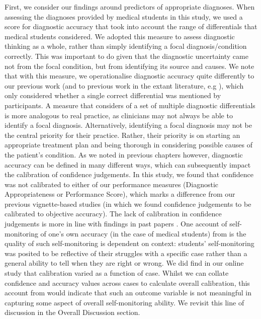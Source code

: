 \documentclass[a4paper, nobind]{templates/ociamthesis}
\begin{document}
First, we consider our findings around predictors of appropriate diagnoses. When assessing the diagnoses provided by medical students in this study, we used a score for diagnostic accuracy that took into account the range of differentials that medical students considered. We adopted this measure to assess diagnostic thinking as a whole, rather than simply identifying a focal diagnosis/condition correctly. This was important to do given that the diagnostic uncertainty came not from the focal condition, but from identifying its source and causes. We note that with this measure, we operationalise diagnostic accuracy quite differently to our previous work (and to previous work in the extant literature, e.g \autocite{meyer_physicians_2013,kammer_differential_2021}), which only considered whether a single correct differential was mentioned by participants. A measure that considers of a set of multiple diagnostic differentials is more analogous to real practice, as clinicians may not always be able to identify a focal diagnosis. Alternatively, identifying a focal diagnosis may not be the central priority for their practice. Rather, their priority is on starting an appropriate treatment plan and being thorough in considering possible causes of the patient's condition. As we noted in previous chapters however, diagnostic accuracy can be defined in many different ways, which can subsequently impact the calibration of confidence judgements. In this study, we found that confidence was not calibrated to either of our performance measures (Diagnostic Appropriateness or Performance Score), which marks a difference from our previous vignette-based studies (in which we found confidence judgements to be calibrated to objective accuracy). The lack of calibration in confidence judgements is more in line with findings in past papers \autocite{friedman_are_2001,meyer_physicians_2013,jaspan_improving_2022}. One account of self-monitoring of one's own accuracy (in the case of medical students) from \textcite{hautz_accuracy_2019} is the quality of such self-monitoring is dependent on context: students' self-monitoring was posited to be reflective of their struggles with a specific case rather than a general ability to tell when they are right or wrong. We did find in our online study that calibration varied as a function of case. Whilst we can collate confidence and accuracy values across cases to calculate overall calibration, this account from \textcite{hautz_accuracy_2019} would indicate that such an outcome variable is not meaningful in capturing some aspect of overall self-monitoring ability. We revisit this line of discussion in the Overall Discussion section.
\end{document}
